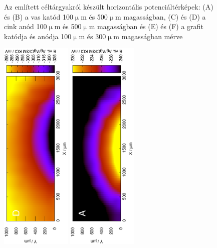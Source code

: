 \begin{figure}
\caption{Az említett céltárgyakról készült horizontális potenciáltérképek:
(A) és (B) a vas katód 100$\upmu$m és 500$\upmu$m magasságban, (C) és (D) a cink anód 100$\upmu$m és 500$\upmu$m magasságban és (E) és (F) a grafit katódja és anódja 100$\upmu$m és 300$\upmu$m magasságban mérve}
\label{fig:horizontális}
\end{figure}


\begin{figure}
\centering
\includegraphics[width=0.3\textwidth, angle=-90]{img/mérések/Fe_v.eps}
\includegraphics[width=0.3\textwidth, angle=-90]{img/mérések/Zn_v.eps}

\end{figure}

